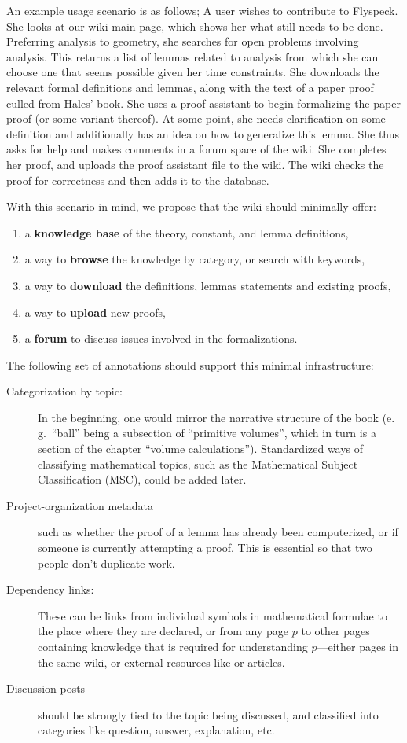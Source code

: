 An example usage scenario is as follows; A user wishes to contribute to
Flyspeck.  She looks at our wiki main page, which shows her what still needs to
be done.  Preferring analysis to geometry, she searches for open problems
involving analysis.  This returns a list of lemmas related to analysis from
which she can choose one that seems possible given her time constraints. She
downloads the relevant formal definitions and lemmas, along with the text of a
paper proof culled from Hales' book.  She uses a proof assistant to begin
formalizing the paper proof (or some variant thereof).  At some point, she needs
clarification on some definition and additionally has an idea on how to
generalize this lemma.  She thus asks for help and makes comments in a forum
space of the wiki.  She completes her proof, and uploads the proof assistant
file to the wiki.  The wiki checks the proof for correctness and then adds it to
the database.

With this scenario in mind, we propose that the wiki should minimally offer: 
\begin{enumerate} 
\item a \textbf{knowledge base} of the theory, constant, and lemma definitions,
\item a way to \textbf{browse} the knowledge by category, or search with keywords,
\item a way to \textbf{download} the definitions, lemmas statements and existing
  proofs,
\item a way to \textbf{upload} new proofs,
\item a \textbf{forum} to discuss issues involved in the formalizations.
\end{enumerate} 

The following set of annotations should support this minimal infrastructure:

\begin{description}
\item[Categorization by topic:] In the beginning, one would mirror the narrative structure
  of the book (e.\,g.\ ``ball'' being a subsection of ``primitive volumes'', which in turn
  is a section of the chapter ``volume calculations'').  Standardized ways of classifying
  mathematical topics, such as the Mathematical Subject Classification
  (MSC)\cite{AMS:MSC2000}, could be added later.
\item[Project-organization metadata] such as whether the proof
  of a lemma has already been computerized, or if someone is currently 
  attempting a proof.  This is essential so that two people don't duplicate
  work.
\item[Dependency links:] These can be links from individual symbols in
  mathematical formulae to the place where they are declared, or from any page
  $p$ to other pages containing knowledge that is required for understanding $p$---either pages in the same wiki, or external resources like
   or  articles.
\item[Discussion posts] should be strongly tied to the topic being discussed,
  and classified into categories like question, answer, explanation, etc.
\end{description}

